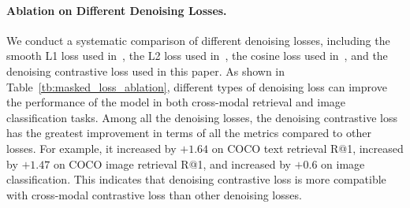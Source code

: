 \paragraph{Ablation on Different Denoising Losses.}
We conduct a systematic comparison of different denoising losses, including the smooth L1 loss used in~\cite{data2vec,maskclip}, the L2 loss used in~\cite{data2vec2,dbot}, the cosine loss used in~\cite{mvp,eva,caev2}, and the denoising contrastive loss used in this paper. 
As shown in Table~\ref{tb:masked_loss_ablation}, different types of denoising loss can improve the performance of the model in both cross-modal retrieval and image classification tasks. 
Among all the denoising losses, the denoising contrastive loss has the greatest improvement in terms of all the metrics compared to other losses. For example, it increased by $+1.64$ on COCO text retrieval R@1, increased by $+1.47$ on COCO image retrieval R@1, and increased by $+0.6$ on image classification. 
This indicates that denoising contrastive loss is more compatible with cross-modal contrastive loss than other denoising losses.





